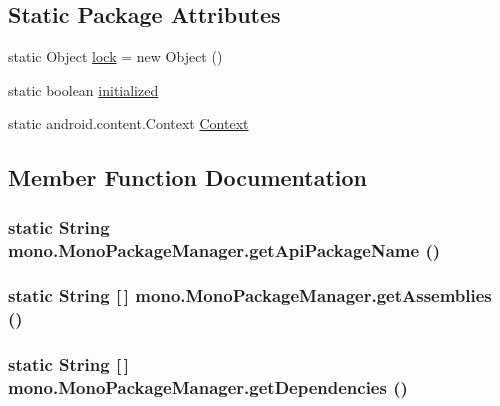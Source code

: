 \subsection*{Static Package Attributes}
\begin{CompactItemize}
\item 
static Object \hyperlink{classmono_1_1_mono_package_manager_4d06b1faa61973f874252c5de3f42ce3}{lock} = new Object ()
\item 
static boolean \hyperlink{classmono_1_1_mono_package_manager_f696e39741e83da48e302adfa1cf119a}{initialized}
\item 
static android.content.Context \hyperlink{classmono_1_1_mono_package_manager_5fdce295817dc558ee9bd80970675ad3}{Context}
\end{CompactItemize}


\subsection{Member Function Documentation}
\hypertarget{classmono_1_1_mono_package_manager_009d16dedf56862f4a23ee05e180e028}{
\subsubsection[{getApiPackageName}]{\setlength{\rightskip}{0pt plus 5cm}static String mono.MonoPackageManager.getApiPackageName ()}}
\label{classmono_1_1_mono_package_manager_009d16dedf56862f4a23ee05e180e028}


\hypertarget{classmono_1_1_mono_package_manager_4db80b0afa9fab894e267e09bc3da334}{
\subsubsection[{getAssemblies}]{\setlength{\rightskip}{0pt plus 5cm}static String \mbox{[}$\,$\mbox{]} mono.MonoPackageManager.getAssemblies ()}}
\label{classmono_1_1_mono_package_manager_4db80b0afa9fab894e267e09bc3da334}


\hypertarget{classmono_1_1_mono_package_manager_708931514353feff12f2cc9d99865a9e}{
\subsubsection[{getDependencies}]{\setlength{\rightskip}{0pt plus 5cm}static String \mbox{[}$\,$\mbox{]} mono.MonoPackageManager.getDependencies ()}}
\label{classmono_1_1_mono_package_manager_708931514353feff12f2cc9d99865a9e}



